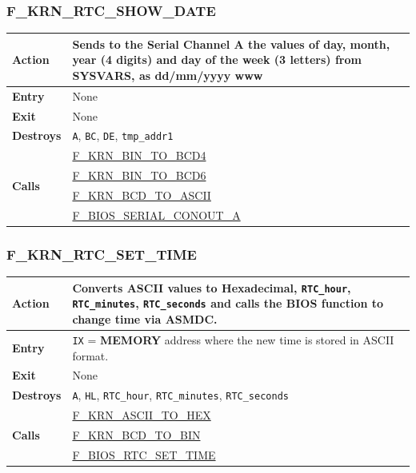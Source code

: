 \documentclass[a4paper,11pt]{article}
\begin{document}
        \subsubsection{F\_KRN\_RTC\_SHOW\_DATE}
        \label{func:fkrnrtcshowdate}
        \begin{tabular}{l p{9cm}}
            \hline\textbf{Action}
            & Sends to the \textbf{Serial Channel A} the values of day, month,
            year (4 digits) and day of the week (3 letters) from SYSVARS, as
            dd/mm/yyyy www\\
            \hline\textbf{Entry} & None \\
            \hline\textbf{Exit} & None \\
            \hline\textbf{Destroys} & \texttt{A}, \texttt{BC}, \texttt{DE},
            \texttt{tmp\_addr1}\\
            \hline\multirow[t]{4}{4em}{\textbf{Calls}}
            & \hyperref[func:fkrnbintobcd4]{F\_KRN\_BIN\_TO\_BCD4}\\
            & \hyperref[func:fkrnbintobcd6]{F\_KRN\_BIN\_TO\_BCD6}\\
            & \hyperref[func:fkrnbcdtoascii]{F\_KRN\_BCD\_TO\_ASCII}\\
            & \hyperref[func:fbiosserialconouta]{F\_BIOS\_SERIAL\_CONOUT\_A}\\
            \hline
        \end{tabular}

        \subsubsection{F\_KRN\_RTC\_SET\_TIME}
        \label{func:fkrnrtcsettime}
        \begin{tabular}{l p{9cm}}
            \hline\textbf{Action}
            & Converts ASCII values to Hexadecimal, \texttt{RTC\_hour},
            \texttt{RTC\_minutes}, \texttt{RTC\_seconds} and calls the BIOS
            function to change time via \textbf{ASMDC}.\\
            \hline\textbf{Entry} & \texttt{IX} = \textbf{MEMORY} address where
            the new time is stored in ASCII format.\\
            \hline\textbf{Exit} & None \\
            \hline\textbf{Destroys} & \texttt{A}, \texttt{HL}, \texttt{RTC\_hour},
            \texttt{RTC\_minutes}, \texttt{RTC\_seconds}\\
            \hline\multirow[t]{3}{4em}{\textbf{Calls}}
            & \hyperref[func:fkrnasciitohex]{F\_KRN\_ASCII\_TO\_HEX}\\
            & \hyperref[func:fkrnbcdtobin]{F\_KRN\_BCD\_TO\_BIN}\\
            & \hyperref[func:fbiosrtcsettime]{F\_BIOS\_RTC\_SET\_TIME}\\
            \hline
        \end{tabular}
\end{document}
